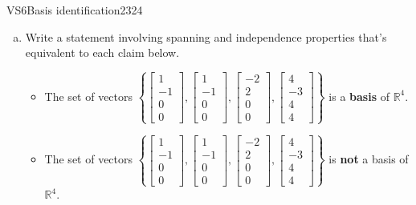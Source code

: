 \begin{exercise}{VS6}{Basis identification}{2324} 
\begin{exerciseStatement} 

\begin{enumerate}[(a)]
\item  

 Write a statement involving spanning and independence properties that's equivalent to each claim below. 

 

\begin{itemize}
\item  

 The set of vectors \(\left\{ \left[\begin{array}{c}
1 \\
-1 \\
0 \\
0
\end{array}\right] , \left[\begin{array}{c}
1 \\
-1 \\
0 \\
0
\end{array}\right] , \left[\begin{array}{c}
-2 \\
2 \\
0 \\
0
\end{array}\right] , \left[\begin{array}{c}
4 \\
-3 \\
4 \\
4
\end{array}\right] \right\}\) is a \textbf{basis} of \(\mathbb{R}^4\). 

 
\item  

 The set of vectors \(\left\{ \left[\begin{array}{c}
1 \\
-1 \\
0 \\
0
\end{array}\right] , \left[\begin{array}{c}
1 \\
-1 \\
0 \\
0
\end{array}\right] , \left[\begin{array}{c}
-2 \\
2 \\
0 \\
0
\end{array}\right] , \left[\begin{array}{c}
4 \\
-3 \\
4 \\
4
\end{array}\right] \right\}\) is \textbf{not} a basis of \(\mathbb{R}^4\). 


\end{itemize}
\end{enumerate}
\end{exerciseStatement}
\end{exercise}
